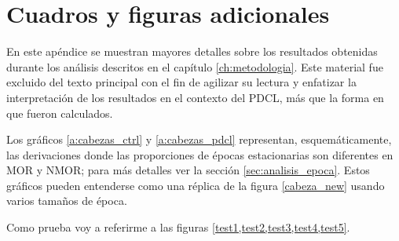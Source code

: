 
\chapter{Cuadros y figuras adicionales}
\label{apendiceA}

En este apéndice se muestran mayores detalles sobre los resultados obtenidas durante los análisis descritos en el capítulo \ref{ch:metodologia}.
%
Este material fue excluido del texto principal con el fin de agilizar su lectura y enfatizar la interpretación de los resultados en el contexto del PDCL, más que la forma en que fueron calculados.

Los gráficos \ref{a:cabezas_ctrl} y \ref{a:cabezas_pdcl} representan, esquemáticamente, las derivaciones donde las proporciones de épocas estacionarias son diferentes en MOR y NMOR; para más detalles ver la sección \ref{sec:analisis_epoca}.
%
Estos gráficos pueden entenderse como una réplica de la figura \ref{cabeza_new} usando varios tamaños de época.

%


Como prueba voy a referirme a las figuras \cref{test1,test2,test3,test4,test5}.

